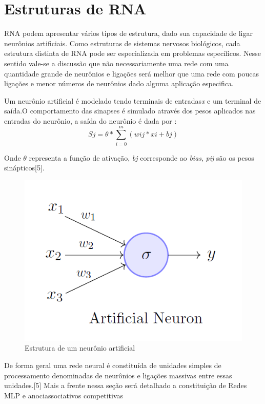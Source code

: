 \section{Estruturas de RNA}
RNA podem apresentar vários tipos de estrutura, dado sua capacidade de ligar neurônios artificiais. Como estruturas de sistemas nervosos biológicos, cada estrutura distinta de RNA pode ser especializada em problemas específicos. Nesse sentido vale-se a discussão que não necessariamente uma rede com uma quantidade grande de neurônios e ligações será melhor que uma rede com poucas ligações e menor números de neurônios dado alguma aplicação especifica.

Um neurônio artificial é modelado tendo terminais de entradas\textit{x} e um terminal de saída.O comportamento das sinapses é simulado através dos pesos aplicados nas entradas do neurônio, a saída do neurônio é dada por : 
\begin{equation}
Sj = \theta *\sum_{i=0}^{m} (wij*xi+bj)
\end{equation}

Onde $\theta$ representa a função de ativação, \textit{bj} corresponde ao \textit{bias}, \textit{pij} são os pesos sinápticos[5].
\begin{figure}[H]

\centering %
\includegraphics[width=\columnwidth]{04-Figuras/fig}
\caption{Estrutura de um neurônio artificial}

\label{figura:arquitetura}

\end{figure}
De forma geral uma rede neural é constituída de unidades simples de processamento denominadas de neurônios e ligações massivas entre essas unidades.[5]
Mais a frente nessa seção será detalhado a constituição de Redes MLP e anociassociativos competitivas



